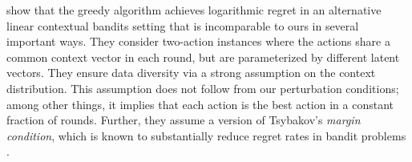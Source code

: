 \citet{bastani2017exploiting} show that the greedy algorithm achieves logarithmic regret in an alternative linear contextual bandits setting that is incomparable to ours in several important ways.
They consider two-action instances where the actions share a common context vector in each round, but are parameterized by different latent vectors. They ensure data diversity via a strong assumption on the context distribution. This assumption does not follow from our perturbation conditions; among other things, it implies that each action is the best action in a constant fraction of rounds. Further, they assume a version of Tsybakov's \emph{margin condition}, which is known to substantially reduce regret rates in bandit problems \citep[\eg see][]{Zeevi-colt10}.

